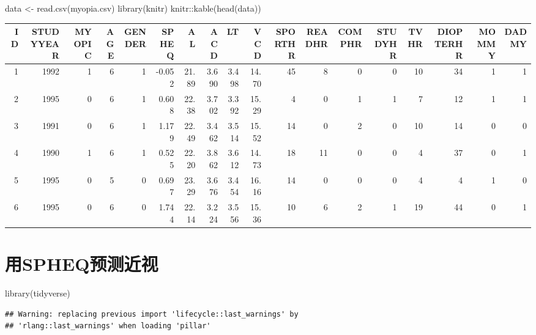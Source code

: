 \documentclass[]{ctexbook}
\newenvironment{Shaded}{\begin{snugshade}}{\end{snugshade}}
\newcommand{\FunctionTok}[1]{\textcolor[rgb]{0.00,0.00,0.00}{#1}}
\newcommand{\NormalTok}[1]{#1}
\newcommand{\OtherTok}[1]{\textcolor[rgb]{0.56,0.35,0.01}{#1}}
\newcommand{\SpecialCharTok}[1]{\textcolor[rgb]{0.00,0.00,0.00}{#1}}
\newcommand{\StringTok}[1]{\textcolor[rgb]{0.31,0.60,0.02}{#1}}
\begin{document}
\begin{Shaded}
\begin{Highlighting}[]
\NormalTok{data }\OtherTok{\textless{}{-}} \FunctionTok{read.csv}\NormalTok{(}\StringTok{\textquotesingle{}myopia.csv\textquotesingle{}}\NormalTok{)}
\FunctionTok{library}\NormalTok{(knitr)}
\NormalTok{knitr}\SpecialCharTok{::}\FunctionTok{kable}\NormalTok{(}\FunctionTok{head}\NormalTok{(data)) }
\end{Highlighting}
\end{Shaded}

\begin{tabular}{r|r|r|r|r|r|r|r|r|r|r|r|r|r|r|r|r|r}
\hline
ID & STUDYYEAR & MYOPIC & AGE & GENDER & SPHEQ & AL & ACD & LT & VCD & SPORTHR & READHR & COMPHR & STUDYHR & TVHR & DIOPTERHR & MOMMY & DADMY\\
\hline
1 & 1992 & 1 & 6 & 1 & -0.052 & 21.89 & 3.690 & 3.498 & 14.70 & 45 & 8 & 0 & 0 & 10 & 34 & 1 & 1\\
\hline
2 & 1995 & 0 & 6 & 1 & 0.608 & 22.38 & 3.702 & 3.392 & 15.29 & 4 & 0 & 1 & 1 & 7 & 12 & 1 & 1\\
\hline
3 & 1991 & 0 & 6 & 1 & 1.179 & 22.49 & 3.462 & 3.514 & 15.52 & 14 & 0 & 2 & 0 & 10 & 14 & 0 & 0\\
\hline
4 & 1990 & 1 & 6 & 1 & 0.525 & 22.20 & 3.862 & 3.612 & 14.73 & 18 & 11 & 0 & 0 & 4 & 37 & 0 & 1\\
\hline
5 & 1995 & 0 & 5 & 0 & 0.697 & 23.29 & 3.676 & 3.454 & 16.16 & 14 & 0 & 0 & 0 & 4 & 4 & 1 & 0\\
\hline
6 & 1995 & 0 & 6 & 0 & 1.744 & 22.14 & 3.224 & 3.556 & 15.36 & 10 & 6 & 2 & 1 & 19 & 44 & 0 & 1\\
\hline
\end{tabular}

\hypertarget{ux7528sphequx9884ux6d4bux8fd1ux89c6}{%
\section{用SPHEQ预测近视}\label{ux7528sphequx9884ux6d4bux8fd1ux89c6}}

\begin{Shaded}
\begin{Highlighting}[]
\FunctionTok{library}\NormalTok{(tidyverse)}
\end{Highlighting}
\end{Shaded}

\begin{verbatim}
## Warning: replacing previous import 'lifecycle::last_warnings' by
## 'rlang::last_warnings' when loading 'pillar'
\end{verbatim}
\end{document}
